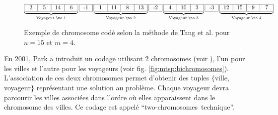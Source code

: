  \begin{figure}
   \centering
   \begin{displaymath}
	\underbrace{
	  \begin{tabular}{|*{4}{p{0.4cm}|}}
	    \hline
	    \centering 2 & \centering 5 & \centering 14 & \centering 6 \tabularnewline
	    \hline
          \end{tabular}
         }_{\text{Voyageur \no 1}}
        \begin{tabular}{|p{0.4cm}|}
 	  \hline
	  \centering -1 \tabularnewline
 	  \hline
        \end{tabular}
	\underbrace{
	  \begin{tabular}{|*{4}{p{0.4cm}|}}
 	    \hline
	    \centering 1 & \centering 11 & \centering 8 & \centering 13 \tabularnewline
 	    \hline
          \end{tabular}
        }_{\text{Voyageur \no 2}}
        \begin{tabular}{|p{0.4cm}|}
 	  \hline
	  \centering -2 \tabularnewline
 	  \hline
        \end{tabular}
        \underbrace{
	  \begin{tabular}{|*{3}{p{0.4cm}|}}
 	    \hline
	    \centering 4 & \centering 10 & \centering 3 \tabularnewline
 	    \hline
          \end{tabular}
        }_{\text{Voyageur \no 3}}
        \begin{tabular}{|p{0.4cm}|}
          \hline
         \centering -3 \tabularnewline
          \hline
        \end{tabular}
        \underbrace{
	  \begin{tabular}{|*{4}{p{0.4cm}|}}
 	    \hline
	    \centering 12 & \centering 15 & \centering 9 & \centering 7 \tabularnewline
 	    \hline
          \end{tabular}
	 }_{\text{Voyageur \no 4}}
    \end{displaymath}
    \caption{Exemple de chromosome codé selon la méthode de Tang et al. pour $n=15$ et $m=4$.}
    \label{fig:mtsp:monochromosome}
  \end{figure}
  
  En 2001, Park a introduit un codage utilisant 2 chromosomes (voir \cite{Park2001}), l'un pour les villes et l'autre pour les voyageurs (voir fig. \ref{fig:mtsp:bichromosomes}). L'association de ces deux chromosomes permet d'obtenir des tuples $\{$ville, voyageur$\}$ représentant une solution au problème. Chaque voyageur devra parcourir les villes associées dans l'ordre où elles apparaissent dans le chromosome des villes. Ce codage est appelé ``two-chromosomes~technique''.
  
